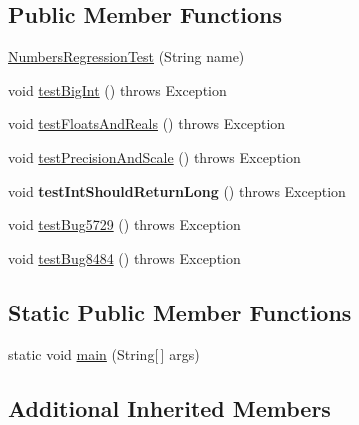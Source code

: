 \subsection*{Public Member Functions}
\begin{DoxyCompactItemize}
\item 
\mbox{\hyperlink{classtestsuite_1_1regression_1_1_numbers_regression_test_a4f4ebba6f0961c6042cab7caf78d1247}{Numbers\+Regression\+Test}} (String name)
\item 
void \mbox{\hyperlink{classtestsuite_1_1regression_1_1_numbers_regression_test_a442fb6acce36ae3342c30c04bac684df}{test\+Big\+Int}} ()  throws Exception 
\item 
void \mbox{\hyperlink{classtestsuite_1_1regression_1_1_numbers_regression_test_a1cee824b008e722d36c7d179fb3774d0}{test\+Floats\+And\+Reals}} ()  throws Exception 
\item 
void \mbox{\hyperlink{classtestsuite_1_1regression_1_1_numbers_regression_test_aad8beaba829a493efd49381a817144b9}{test\+Precision\+And\+Scale}} ()  throws Exception 
\item 
\mbox{\label{classtestsuite_1_1regression_1_1_numbers_regression_test_ab804942f92985dc6aef8d3c368368e52}} 
void {\bfseries test\+Int\+Should\+Return\+Long} ()  throws Exception 
\item 
void \mbox{\hyperlink{classtestsuite_1_1regression_1_1_numbers_regression_test_a8b734d31cfe73a510c1e2c9a5f2d049f}{test\+Bug5729}} ()  throws Exception 
\item 
void \mbox{\hyperlink{classtestsuite_1_1regression_1_1_numbers_regression_test_a28ea888d744588001519dd5cafde7074}{test\+Bug8484}} ()  throws Exception 
\end{DoxyCompactItemize}
\subsection*{Static Public Member Functions}
\begin{DoxyCompactItemize}
\item 
static void \mbox{\hyperlink{classtestsuite_1_1regression_1_1_numbers_regression_test_a76a80229b5821f90dff89a1d63388e41}{main}} (String\mbox{[}$\,$\mbox{]} args)
\end{DoxyCompactItemize}
\subsection*{Additional Inherited Members}


